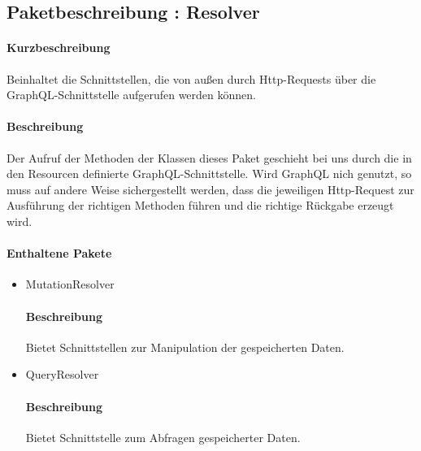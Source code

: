 \subsection{Paketbeschreibung : Resolver}%
\paragraph*{Kurzbeschreibung}
Beinhaltet die Schnittstellen, die von außen durch Http-Requests über die GraphQL-Schnittstelle aufgerufen werden können.
\paragraph*{Beschreibung}
Der Aufruf der Methoden der Klassen dieses Paket geschieht bei uns durch die in den Resourcen definierte GraphQL-Schnittstelle.
Wird GraphQL nich genutzt, so muss auf andere Weise sichergestellt werden, dass die jeweiligen Http-Request zur Ausführung der richtigen Methoden
führen und die richtige Rückgabe erzeugt wird.
\paragraph*{Enthaltene Pakete}
\begin{itemize}
    \item MutationResolver
    		\paragraph*{Beschreibung}
            Bietet Schnittstellen zur Manipulation der gespeicherten Daten.
    \item QueryResolver
    		\paragraph*{Beschreibung}
    		Bietet Schnittstelle zum Abfragen gespeicherter Daten.
\end{itemize}

